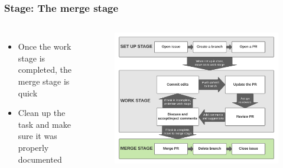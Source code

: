 \documentclass[aspectratio=169]{beamer} %
\begin{document}
\begin{frame}
	\frametitle{Stage: The merge stage}
	\begin{columns}[c]
		
		\begin{itemize}
			\setlength\itemsep{1em}
			\item Once the work stage is completed, the merge stage is quick
			\item Clean up the task and make sure it was properly documented
		\end{itemize}
		
		\vspace{-.75cm}
		\begin{figure}
			\centering
			\includegraphics[width=\textwidth]{./img/branch-pr-merge-cycle-S3.png}
		\end{figure}
		
	\end{columns}
\end{frame}
\end{document}
